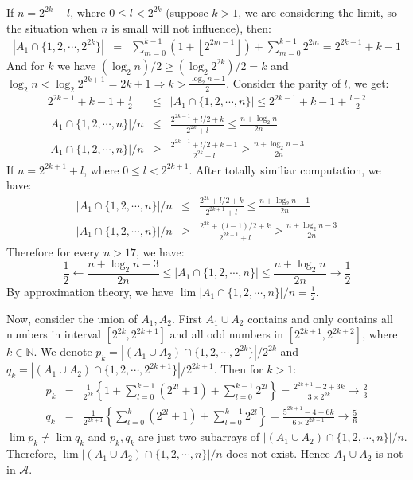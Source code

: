 \documentclass[11pt]{article}
\newcommand{\floor}[1]{\left\lfloor #1 \right\rfloor}
\begin{document}
\begin{enumerate}[1.1.6]
    If $n = 2^{2k}+l$, where $0 \le l < 2^{2k}$ (suppose $k > 1$, we are considering the limit, so the situation when $n$ is small will not influence), then:
    \begin{eqnarray}
        |A_1 \cap \{1,2,\cdots,2^{2k}\}| &=& \sum_{m=0}^{k-1}(1 + \floor{2^{2m-1}}) + \sum_{m=0}^{k-1} 2^{2m} =  2^{2k-1} + k-1
    \end{eqnarray}
    And for $k$ we have $(\log_2 n)/2 \ge (\log_2 2^{2k})/2 = k$ and $\log_2 n < \log_2 2^{2k+1} = 2k + 1 \Rightarrow k > \frac{\log_2 n - 1}{2} $. Consider the parity of $l$, we get:
    \begin{eqnarray}
        2^{2k-1} + k-1 + \frac{l}{2} &\le& |A_1 \cap \{1,2,\cdots,n\}| \le 2^{2k-1} + k-1 + \frac{l+2}{2} \\
        |A_1 \cap \{1,2,\cdots,n\}| / n &\le& \frac{2^{2k-1} + l/2 + k}{2^{2k} + l} \le \frac{n+\log_2 n }{2n} \\
        |A_1 \cap \{1,2,\cdots,n\}| / n &\ge& \frac{2^{2k-1} + l/2 + k - 1}{2^{2k} + l} \ge \frac{n+\log_2 n -3}{2n}
    \end{eqnarray}
    If $n = 2^{2k+1}+l$, where $0 \le l < 2^{2k+1}$. After totally similiar computation, we have:
    \begin{eqnarray}
        |A_1 \cap \{1,2,\cdots,n\}| / n &\le& \frac{2^{2k} + l/2 + k}{2^{2k+1} + l} \le \frac{n+\log_2 n -1}{2n} \\
        |A_1 \cap \{1,2,\cdots,n\}| / n &\ge& \frac{2^{2k} + (l-1)/2 + k}{2^{2k+1} + l} \ge \frac{n+\log_2 n -3}{2n}
    \end{eqnarray}
    Therefore for every $n > 17$, we have:
    $$\frac{1}{2} \leftarrow \frac{n+\log_2 n -3}{2n} \le |A_1 \cap \{1,2,\cdots,n\}| \le \frac{n+\log_2 n }{2n} \to \frac{1}{2}$$
    By approximation theory, we have $\lim |A_1 \cap \{1,2,\cdots,n\}| / n = \frac{1}{2}$.

    Now, consider the union of $A_1, A_2$. First $A_1 \cup A_2$ contains and only contains all numbers in interval $[2^{2k}, 2^{2k+1}]$ and all odd numbers in $[2^{2k+1}, 2^{2k+2}]$, where $k \in \mathbb{N}$.
    We denote $p_k = |(A_1 \cup A_2) \cap \{1,2,\cdots, 2^{2k}\}| / 2^{2k}$ and $q_k = |(A_1 \cup A_2) \cap \{1,2,\cdots, 2^{2k+1}\}| / 2^{2k+1}$. Then for $k > 1$:
    \begin{eqnarray}
        p_k &=& \frac{1}{2^{2k}} \left\{1 + \sum_{l=0}^{k-1} (2^{2l}+1) + \sum_{l=0}^{k-1} 2^{2l}\right\} = \frac{2^{2k+1} - 2 +3k}{3\times2^{2k}} \to \frac{2}{3} \\
        q_k &=& \frac{1}{2^{2k+1}} \left\{\sum_{l=0}^{k} (2^{2l}+1) + \sum_{l=0}^{k-1} 2^{2l}\right\} = \frac{5^{2k+1} - 4 +6k}{6\times2^{2k+1}} \to \frac{5}{6}         
    \end{eqnarray}
    $\lim p_k \ne \lim q_k$ and $p_k, q_k$ are just two subarrays of $|(A_1 \cup A_2) \cap \{1,2,\cdots, n\}| / n$. Therefore, $\lim |(A_1 \cup A_2) \cap \{1,2,\cdots, n\}| / n$ does not exist. Hence $A_1 \cup A_2$ is not in $\mathcal{A}$.

\end{enumerate}
\end{document}
